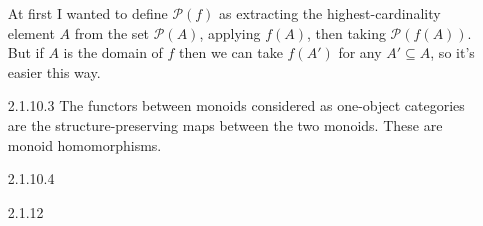 \documentclass{article}
\newcommand{\pow}{\mathcal{P}}
\newcommand{\fpow}{\mathbf{\mathcal{P}}}
\begin{document}
\begin{enumerate}
  At first I wanted to define $\fpow(f)$ as extracting the highest-cardinality element $A$ from the set $\pow(A)$, applying $f(A)$, then taking $\pow(f(A))$.
  But if $A$ is the domain of $f$ then we can take $f(A')$ for any $A' \subseteq A$, so it's easier this way.
\item[]
\item[2.1.10.3] The functors between monoids considered as one-object categories are the structure-preserving maps between the two monoids.
  These are monoid homomorphisms.

\item[]
\item [2.1.10.4]

\item[]
\item [2.1.12]
\end{enumerate}
\end{document}
